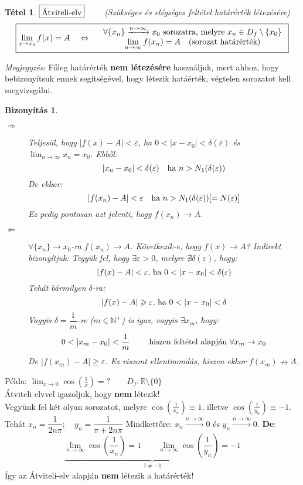 \documentclass[a4paper,12pt,twoside]{book}
\newtheorem{tetel}{Tétel}[chapter]
\theoremstyle{break}
\newtheorem{biz}{Bizonyítás}[chapter]
\theoremstyle{plain}
\begin{document}
\begin{tetel}$\boxed{$Átviteli-elv$} \qquad$ (Szükséges és elégséges feltétel határérték létezésére)\\
 \[\boxed{\lim_{x\to x_0} f(x) = A \quad \Leftrightarrow \quad
    \begin{array}{c}
      \forall \{x_n\} \xrightarrow{n\to\infty} x_0 \hbox{ sorozatra, melyre } x_n\in D_f\setminus\{x_0\}\\
      \displaystyle\lim_{n\to\infty} f(x_n) = A \quad \hbox{(sorozat határérték)}
    \end{array}}\]
\end{tetel}
\emph{Megjegyzés}: Főleg határérték \textbf{nem létezésére} használjuk, mert ahhoz, hogy bebizonyítsuk ennek segítségével, hogy létezik hatáérték, végtelen sorozatot kell megvizsgálni.
\begin{biz}
 \begin{description}
  \item[$\Rightarrow$] Teljesül, hogy $|f(x)-A|<\varepsilon$, ha $0<|x-x_0|<\delta(\varepsilon)$ és $\displaystyle \lim_{n\to\infty} x_n = x_0$. Ebből:
 \[|x_n-x_0|<\delta(\varepsilon) \quad \hbox{ha } n>N_1(\delta(\varepsilon))\]
 De ekkor:
 \[|f(x_n)-A|<\varepsilon \quad \hbox{ha } n>N_1(\delta(\varepsilon))[=N(\varepsilon)]\]
 Ez pedig pontosan azt jelenti, hogy $f(x_n) \to A$.
  \item[$\Leftarrow$] $\forall\{x_n\}\to x_0$-ra $f(x_n)\to A$. Következik-e, hogy $f(x)\to A$? Indirekt bizonyítjuk: Tegyük fel, hogy $\exists\varepsilon >0$, melyre $\nexists\delta(\varepsilon)$, hogy:
\[|f(x)-A|<\varepsilon\hbox{, ha } 0<|x-x_0|<\delta(\varepsilon)\]
Tehát bármilyen $\delta$-ra:
\[|f(x)-A|\geqslant\varepsilon\hbox{, ha } 0<|x-x_0|<\delta\]
Vagyis $\delta=\dfrac{1}{m}$-re ($m\in\mathbb{N}^+$) is igaz, vagyis $\exists x_m$, hogy:
\[0<|x_m-x_0|<\frac{1}{m} \qquad \hbox{ hiszen feltétel alapján } \forall x_m\to x_0\]
De $|f(x_m)-A| \geqslant \varepsilon$. Ez viszont ellentmondás, hiszen ekkor $f(x_m)\nrightarrow A$.
 \end{description}

\end{biz}

Példa: $\displaystyle \lim_{x\to 0} \cos\left(\frac{1}{x}\right) = ? \qquad D_f: \mathbb{R}\setminus\{0\}$\\
Átviteli elvvel igazoljuk, hogy \textbf{nem} létezik!\\
Vegyünk fel két olyan sorozatot, melyre $\cos\left(\frac{1}{x_n}\right) \equiv 1$, illetve $\cos\left(\frac{1}{y_n}\right) \equiv -1$.\\
Tehát $x_n = \dfrac{1}{2n\pi}; \quad y_n = \dfrac{1}{\pi+2n\pi}$
Mindkettőre: $x_n\xrightarrow{n\to\infty} 0$ és $y_n\xrightarrow{n\to\infty} 0$. \textbf{De}:
\[\underbrace{\lim_{n\to\infty} \cos\left(\frac{1}{x_n}\right) = 1 \qquad \lim_{n\to\infty} \cos\left(\frac{1}{y_n}\right) = -1}_{1 \neq -1}\]
Így az Átviteli-elv alapján \textbf{nem} létezik a határérték!
\end{document}
